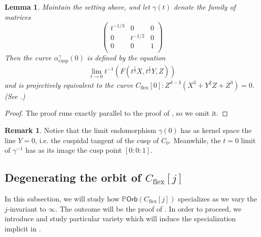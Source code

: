 \documentclass[12 pt, reqno]{amsart}
\newtheorem{lem}[thm]{Lemma}
\theoremstyle{definition}
\newtheorem{rmk}[thm]{Remark}
\newcommand{\on}{\operatorname}
\newcommand{\mb}{\mathbb}
\renewcommand{\P}{\mb{P}}
\newcommand{\Orb}{\mathsf{Orb}}
\begin{document}
\begin{lem}
\label{cuspmatrix}
Maintain the setting above, and let $\gamma(t)$ denote the family of
matrices
\[\begin{pmatrix}
    t^{-1/3} & 0 & 0 \\
    0 & t^{-1/2} & 0 \\
    0 & 0 & 1\\
  \end{pmatrix}
  \]
  Then the curve $\alpha_{\on{cusp}}^{\gamma}(0)$ is defined by the
  equation
\begin{align*}
    \lim_{t\to 0}t^{-1}(F(t^{\frac{1}{3}}X,t^{\frac{1}{2}}Y,Z))
\end{align*}
and is projectively equivalent to the curve
$C_{\on{flex}}[0]: Z^{d-3}(X^3+Y^2Z+Z^3) = 0$. (See
.)
\end{lem}

\begin{proof}
  The proof runs exactly parallel to the proof of ,
  so we omit it.

\end{proof}

\begin{rmk}
  \label{rmk:cuspkernel}
  Notice that the limit endomorphism $\gamma(0)$ has as kernel space
  the line $Y=0$, i.e. the cuspidal tangent of the cusp of $C_0$.
  Meanwhile, the $t=0$ limit of $\gamma^{-1}$ has as its image the
  cusp point $[0:0:1]$.
\end{rmk}

\subsection{Degenerating the orbit of $C_{\on{flex}}[j]$}
\label{sec:jdegeneration}

In this subsection, we will study how $\P \Orb(C_{\on{flex}}[j])$
specializes as we vary the $j$-invariant to $\infty$.  The outcome
will be the proof of .  In order to proceed, we
introduce and study particular variety which will induce the
specialization implicit in .
\end{document}
